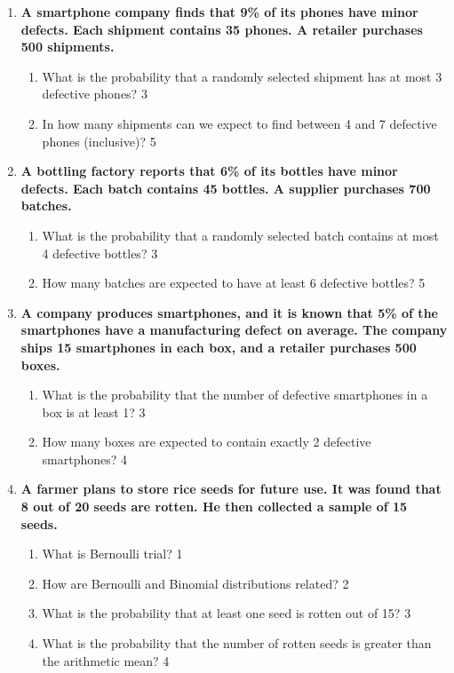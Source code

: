 \documentclass[a4paper,oneside, margin=1.4in]{book}
\begin{document}
\begin{enumerate}
  \item  
  \textbf{A smartphone company finds that 9\% of its phones have minor defects. Each shipment contains 35 phones. A retailer purchases 500 shipments.}  

  \begin{enumerate}  
    \item  
      What is the probability that a randomly selected shipment has at most 3 defective phones? \hfill 3  
    \item  
      In how many shipments can we expect to find between 4 and 7 defective phones (inclusive)? \hfill 5  
  \end{enumerate}  

\item  
  \textbf{A bottling factory reports that 6\% of its bottles have minor defects. Each batch contains 45 bottles. A supplier purchases 700 batches.}  

  \begin{enumerate}  
    \item  
      What is the probability that a randomly selected batch contains at most 4 defective bottles? \hfill 3  
    \item  
      How many batches are expected to have at least 6 defective bottles? \hfill 5  
  \end{enumerate}  

  
  \item
	  \textbf{A company produces smartphones, and it is known that 5\% of the 
	  smartphones have a manufacturing defect on average. The company ships 15 
	  smartphones in each box, and a retailer purchases 500 boxes.} 
  
  \begin{enumerate}
    \item  
	What is the probability that the number of defective smartphones in a box 
	is at least 1? \hfill 3
    \item
	How many boxes are expected to contain exactly 2 defective smartphones? \hfill 4
  \end{enumerate}

  
 \item
	  \textbf{A farmer plans to store rice seeds for future use. It was found 
	  that 8 out of 20 seeds are rotten. He then collected a sample of 15 seeds.} 
  
  \begin{enumerate}
    \item
	What is Bernoulli trial? \hfill 1
    \item
	How are Bernoulli and Binomial distributions related? \hfill 2
    \item  
	What is the probability that at least one seed is rotten out of 15? \hfill 3
    \item
	What is the probability that the number of rotten seeds is greater than the arithmetic mean? \hfill 4
  \end{enumerate}


\end{enumerate}
\end{document}
